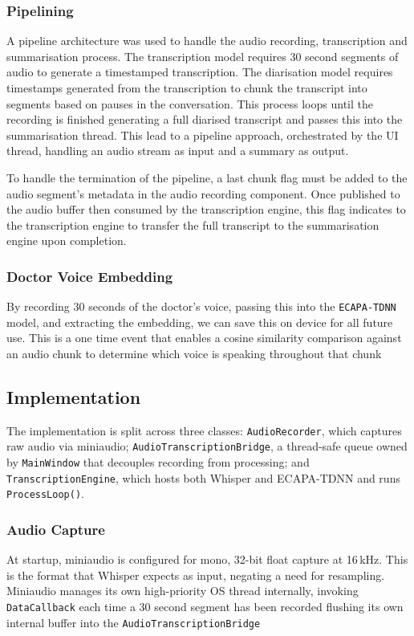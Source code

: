 \subsubsection{Pipelining}
A pipeline architecture was used to handle the audio recording, transcription and summarisation process. The transcription model requires 30 second segments of audio to generate a timestamped transcription. The diarisation model requires timestamps generated from the transcription to chunk the transcript into segments based on pauses in the conversation. This process loops until the recording is finished generating a full diarised transcript and passes this into the summarisation thread. This lead to a pipeline approach, orchestrated by the UI thread, handling an audio stream as input and a summary as output. 

To handle the termination of the pipeline, a last chunk flag must be added to the audio segment's metadata in the audio recording component. Once published to the audio buffer then consumed by the transcription engine, this flag indicates to the transcription engine to transfer the full transcript to the summarisation engine upon completion.

\subsubsection{Doctor Voice Embedding}
By recording 30 seconds of the doctor's voice, passing this into the \texttt{ECAPA-TDNN} model, and extracting the embedding, we can save this on device for all future use. This is a one time event that enables a cosine similarity comparison against an audio chunk to determine which voice is speaking throughout that chunk

\subsection{Implementation}
The implementation is split across three classes: \texttt{AudioRecorder}, which captures raw audio via miniaudio; \texttt{AudioTranscriptionBridge}, a thread-safe queue owned by \texttt{MainWindow} that decouples recording from processing; and \texttt{TranscriptionEngine}, which hosts both Whisper and ECAPA-TDNN and runs \texttt{ProcessLoop()}.

\subsubsection{Audio Capture}
At startup, miniaudio is configured for mono, 32-bit float capture at 16\,kHz. This is the format that Whisper expects as input, negating a need for resampling. Miniaudio manages its own high-priority OS thread internally, invoking \texttt{DataCallback} each time a 30 second segment has been recorded flushing its own internal buffer into the \texttt{AudioTranscriptionBridge}

